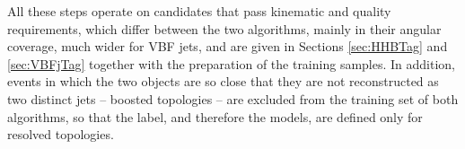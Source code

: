 All these steps operate on candidates that pass kinematic and quality requirements, which differ between the two algorithms, mainly in their angular coverage, much wider for VBF jets, and are given in Sections \ref{sec:HHBTag} and \ref{sec:VBFjTag} together with the preparation of the training samples. In addition, events in which the two objects are so close that they are not reconstructed as two distinct jets -- boosted topologies -- are excluded from the training set of both algorithms, so that the label, and therefore the models, are defined only for resolved topologies.\medskip
%
\newcommand{\jetglyph}[4]{%
  \node[#4] (#1) at (#2,#3) {};
  \fill[black!45] (#2-0.19,#3+0.13) circle (0.42mm);
  \fill[black!45] (#2+0.16,#3+0.06) circle (0.42mm);
  \fill[black!45] (#2-0.06,#3-0.16) circle (0.42mm);
  \fill[black!45] (#2+0.21,#3-0.19) circle (0.42mm);
  \fill[black!45] (#2-0.22,#3-0.05) circle (0.42mm);
}
